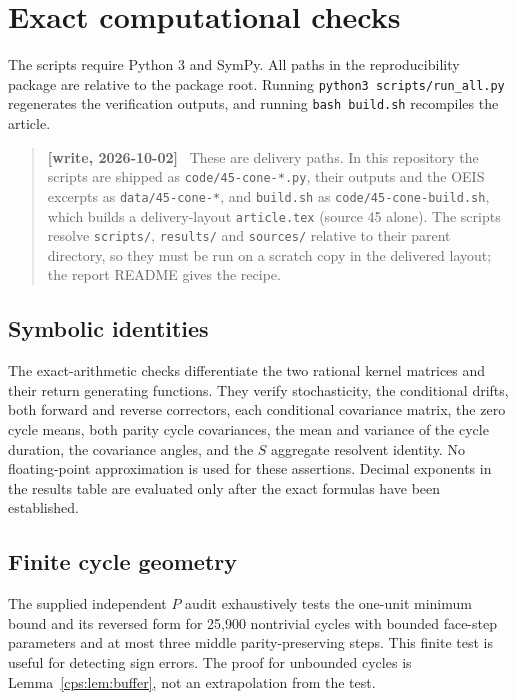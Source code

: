 \documentclass[11pt,letterpaper]{article}
\numberwithin{equation}{section}
\theoremstyle{remark}\newtheorem{remark}[theorem]{Remark}
\newenvironment{writenote}{\begin{quote}\small\sloppy\textbf{[write, 2026-10-02]}\ }{\end{quote}}
\begin{document}
\appendix

\section{Exact computational checks}\label{cps:app:checks}
The scripts require Python 3 and SymPy. All paths in the reproducibility package are relative to the package root. Running \texttt{python3 scripts/run\_all.py} regenerates the verification outputs, and running \texttt{bash build.sh} recompiles the article.

\begin{writenote}
These are delivery
paths. In this repository the scripts are shipped as \texttt{code/45-cone-*.py}, their outputs
and the OEIS excerpts as \texttt{data/45-cone-*}, and \texttt{build.sh} as
\texttt{code/45-cone-build.sh}, which builds a delivery-layout \texttt{article.tex} (source 45
alone). The scripts resolve \texttt{scripts/}, \texttt{results/} and \texttt{sources/} relative to
their parent directory, so they must be run on a scratch copy in the delivered layout; the
report README gives the recipe.
\end{writenote}

\subsection{Symbolic identities}
The exact-arithmetic checks differentiate the two rational kernel matrices and their return generating functions. They verify stochasticity, the conditional drifts, both forward and reverse correctors, each conditional covariance matrix, the zero cycle means, both parity cycle covariances, the mean and variance of the cycle duration, the covariance angles, and the $S$ aggregate resolvent identity. No floating-point approximation is used for these assertions. Decimal exponents in the results table are evaluated only after the exact formulas have been established.

\subsection{Finite cycle geometry}
The supplied independent $P$ audit exhaustively tests the one-unit minimum bound and its reversed form for 25,900 nontrivial cycles with bounded face-step parameters and at most three middle parity-preserving steps. This finite test is useful for detecting sign errors. The proof for unbounded cycles is Lemma~\ref{cps:lem:buffer}, not an extrapolation from the test.
\end{document}
